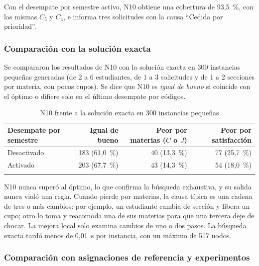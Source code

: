 Con el desempate por semestre activo, N10 obtiene una cobertura de 93,5~\%, con las mismas $C_5$ y $C_4$, e informa tres solicitudes con la causa ``Cedida por prioridad''.

\subsubsection{Comparación con la solución exacta}

Se compararon los resultados de N10 con la solución exacta en 300 instancias pequeñas generadas (de 2 a 6 estudiantes, de 1 a 3 solicitudes y de 1 a 2 secciones por materia, con pocos cupos). Se dice que N10 es \emph{igual de bueno} si coincide con el óptimo o difiere solo en el último desempate por códigos.

\begin{table}[htbp]
\caption{N10 frente a la solución exacta en 300 instancias pequeñas}\label{tab:exacto}
\footnotesize
\begin{tabular*}{\textwidth}{@{\extracolsep\fill}lrrr@{}}
\toprule
Desempate por semestre & Igual de bueno & Peor por materias ($C$ o $J$) & Peor por satisfacción \\
\midrule
Desactivado & 183 (61,0~\%) & 40 (13,3~\%) & 77 (25,7~\%) \\
Activado & 203 (67,7~\%) & 43 (14,3~\%) & 54 (18,0~\%) \\
\botrule
\end{tabular*}
\end{table}

N10 nunca superó al óptimo, lo que confirma la búsqueda exhaustiva, y su salida nunca violó una regla. Cuando pierde por materias, la causa típica es una cadena de tres o más cambios: por ejemplo, un estudiante cambia de sección y libera un cupo; otro lo toma y reacomoda una de sus materias para que una tercera deje de chocar. La mejora local solo examina cambios de uno o dos pasos. La búsqueda exacta tardó menos de 0,01~s por instancia, con un máximo de 517 nodos.

\subsubsection{Comparación con asignaciones de referencia y experimentos}

